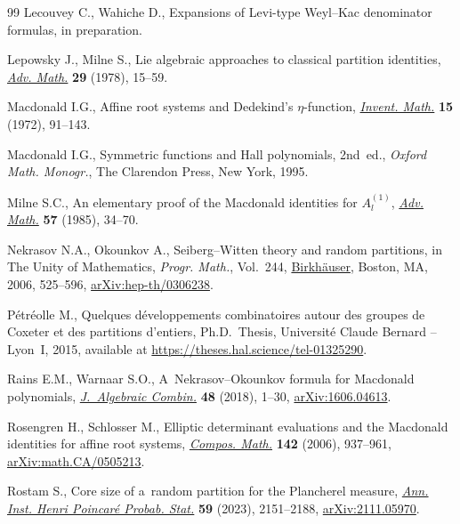 \documentclass[10pt,a4paper]{amsart}
\numberwithin{equation}{section}
\begin{document}
\begin{thebibliography}{99}
Lecouvey C., Wahiche D., Expansions of {L}evi-type {W}eyl--{K}ac denominator
 formulas, {i}n preparation.

Lepowsky J., Milne S., Lie algebraic approaches to classical partition
 identities, \href{https://doi.org/10.1016/0001-8708(78)90004-X}{\textit{Adv. Math.}} \textbf{29} (1978), 15--59.

Macdonald I.G., Affine root systems and {D}edekind's {$\eta $}-function,
 \href{https://doi.org/10.1007/BF01418931}{\textit{Invent. Math.}} \textbf{15} (1972), 91--143.

Macdonald I.G., Symmetric functions and {H}all polynomials, 2nd~ed., \textit{Oxford
 Math. Monogr.}, The Clarendon Press, New York, 1995.

Milne S.C., An elementary proof of the {M}acdonald identities for
 {$A^{(1)}_l$}, \href{https://doi.org/10.1016/0001-8708(85)90105-7}{\textit{Adv. Math.}} \textbf{57} (1985), 34--70.

Nekrasov N.A., Okounkov A., {S}eiberg--{W}itten theory and random partitions,
 in The Unity of Mathematics, \textit{Progr. Math.}, Vol.~244, \href{https://doi.org/10.1007/0-8176-4467-9_15}{Birkh\"auser},
 Boston, MA, 2006, 525--596, \href{https://arxiv.org/abs/hep-th/0306238}{arXiv:hep-th/0306238}.

P\'etr\'eolle M., Quelques d\'eveloppements combinatoires autour des groupes de
 Coxeter et des partitions d'entiers, Ph.D.~Thesis, {U}niversit\'e Claude
 Bernard -- Lyon~I, 2015, available at
 \url{https://theses.hal.science/tel-01325290}.

Rains E.M., Warnaar S.O., A~{N}ekrasov--{O}kounkov formula for {M}acdonald
 polynomials, \href{https://doi.org/10.1007/s10801-017-0790-2}{\textit{J.~Algebraic Combin.}} \textbf{48} (2018), 1--30,
 \href{https://arxiv.org/abs/1606.04613}{arXiv:1606.04613}.

Rosengren H., Schlosser M., Elliptic determinant evaluations and the
 {M}acdonald identities for affine root systems, \href{https://doi.org/10.1112/S0010437X0600203X}{\textit{Compos. Math.}}
 \textbf{142} (2006), 937--961, \href{https://arxiv.org/abs/math.CA/0505213}{arXiv:math.CA/0505213}.

Rostam S., Core size of a~random partition for the {P}lancherel measure,
 \href{https://doi.org/10.1214/22-aihp1310}{\textit{Ann. Inst. Henri Poincar\'e Probab. Stat.}} \textbf{59} (2023),
 2151--2188, \href{https://arxiv.org/abs/2111.05970}{arXiv:2111.05970}.


\end{thebibliography}
\end{document}
